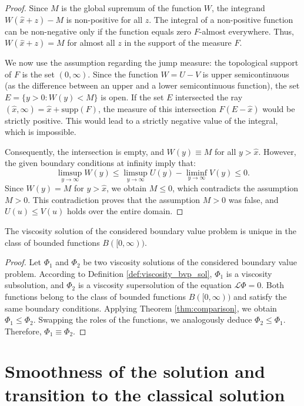 \documentclass[smallextended]{svjour3}
\begin{document}
\begin{proof}
Since $M$ is the global supremum of the function $W$, the integrand $W(\hat{x}+z) - M$ is non-positive for all $z$. The integral of a non-positive function can be non-negative only if the function equals zero $F$-almost everywhere. Thus, $W(\hat{x}+z) = M$ for almost all $z$ in the support of the measure $F$.

We now use the assumption regarding the jump measure: the topological support of $F$ is the set $(0, \infty)$. Since the function $W = U - V$ is upper semicontinuous (as the difference between an upper and a lower semicontinuous function), the set $E = \{y > 0 : W(y) < M\}$ is open. If the set $E$ intersected the ray $(\hat{x}, \infty) = \hat{x} + \text{supp}(F)$, the measure of this intersection $F(E - \hat{x})$ would be strictly positive. This would lead to a strictly negative value of the integral, which is impossible.

Consequently, the intersection is empty, and $W(y) \equiv M$ for all $y > \hat{x}$. However, the given boundary conditions at infinity imply that:
$$ \limsup_{y \to \infty} W(y) \le \limsup_{y \to \infty} U(y) - \liminf_{y \to \infty} V(y) \le 0. $$
Since $W(y) = M$ for $y > \hat{x}$, we obtain $M \le 0$, which contradicts the assumption $M > 0$. This contradiction proves that the assumption $M > 0$ was false, and $U(u) \le V(u)$ holds over the entire domain.
\end{proof}

\begin{corollary}
The viscosity solution of the considered boundary value problem is unique in the class of bounded functions $B([0, \infty))$.
\end{corollary}

\begin{proof}
Let $\Phi_1$ and $\Phi_2$ be two viscosity solutions of the considered boundary value problem. According to Definition \ref{def:viscosity_bvp_sol}, $\Phi_1$ is a viscosity subsolution, and $\Phi_2$ is a viscosity supersolution of the equation $\mathcal{L}\Phi = 0$. Both functions belong to the class of bounded functions $B([0, \infty))$ and satisfy the same boundary conditions. Applying Theorem \ref{thm:comparison}, we obtain $\Phi_1 \le \Phi_2$. Swapping the roles of the functions, we analogously deduce $\Phi_2 \le \Phi_1$. Therefore, $\Phi_1 \equiv \Phi_2$.
\end{proof}

\section{Smoothness of the solution and transition to the classical solution}
\label{sec:regularity}
\end{document}
